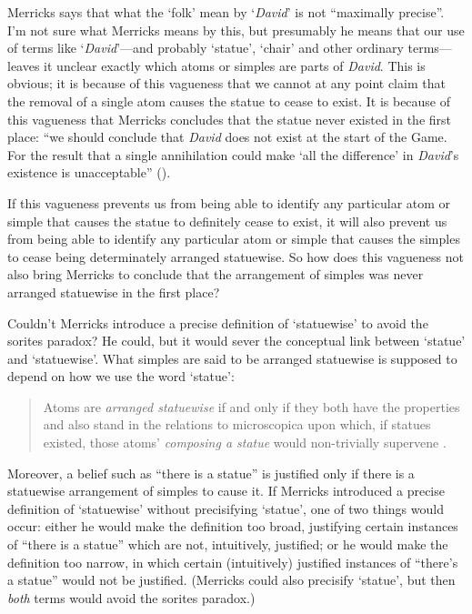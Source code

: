 \documentclass[11pt]{standalone} \newif\ifstandlone \standalonetrue
\newenvironment{squote}{%
	\begin{quote}\begin{singlespace}%
	}{%
	\end{singlespace}\end{quote}}
\begin{document}
\begin{spacing}{1.5}
Merricks says that what the `folk' mean by `{\em David}' is not
``maximally precise''.  I'm not sure what Merricks means by this, but
presumably he means that our use of terms like `{\em David}'---and
probably `statue', `chair' and other ordinary terms---leaves it
unclear exactly which atoms or simples are parts of {\em David}.  This
is obvious; it is because of this vagueness that we cannot at any
point claim that the removal of a single atom causes the statue to
cease to exist.  It is because of this vagueness that Merricks
concludes that the statue never existed in the first place: ``we
should conclude that {\em David} does not exist at the start of the
Game.  For the result that a single annihilation could make `all the
difference' in {\em David}'s existence is unacceptable''
(\citeyear[33]{merricks2001a}).  

If this vagueness prevents us from being able to identify any
particular atom or simple that causes the statue to definitely cease
to exist, it will also prevent us from being able to identify any
particular atom or simple that causes the simples to cease being
determinately arranged statuewise.  So how does this vagueness not
also bring Merricks to conclude that the arrangement of simples was
never arranged statuewise in the first place?

Couldn't Merricks introduce a precise definition of `statuewise' to
avoid the sorites paradox?  He could, but it would sever the
conceptual link between `statue' and `statuewise'.  What simples are
said to be arranged statuewise is supposed to depend on how we use the
word `statue':

\begin{squote}
Atoms are {\em arranged statuewise} if and only if they both have the
properties and also stand in the relations to microscopica upon which,
if statues existed, those atoms' {\em composing a statue} would
non-trivially supervene \citep[4]{merricks2001a}.
\end{squote}

Moreover, a belief such as ``there is a statue'' is justified only if
there is a statuewise arrangement of simples to cause it.  If Merricks
introduced a precise definition of `statuewise' without precisifying
`statue', one of two things would occur: either he would make the
definition too broad, justifying certain instances of ``there is a
statue'' which are not, intuitively, justified; or he would make the
definition too narrow, in which certain (intuitively) justified
instances of ``there's a statue'' would not be justified.  (Merricks
could also precisify `statue', but then {\em both} terms would avoid
the sorites paradox.)


\end{spacing}
\end{document}
